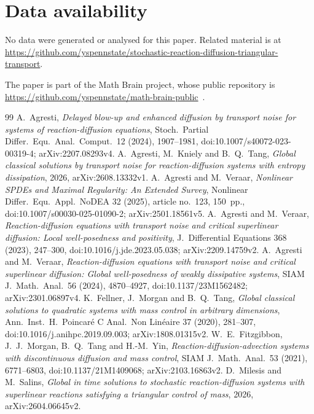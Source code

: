 \documentclass[11pt]{amsart}
\theoremstyle{definition}
\numberwithin{equation}{section}
\begin{document}
\section*{Data availability}
No data were generated or analysed for this paper. Related material is at
\url{https://github.com/yspennstate/stochastic-reaction-diffusion-triangular-transport}.

The paper is part of the Math Brain project, whose public repository is \url{https://github.com/yspennstate/math-brain-public}~\cite{MathBrainRepo}.

\begin{thebibliography}{99}
 A.~Agresti, \emph{Delayed blow-up and enhanced diffusion by transport noise for systems of reaction-diffusion equations}, Stoch.\ Partial Differ.\ Equ.\ Anal.\ Comput.\ 12 (2024), 1907--1981, doi:10.1007/s40072-023-00319-4; arXiv:2207.08293v4.
 A.~Agresti, M.~Kniely and B.~Q.~Tang, \emph{Global classical solutions by transport noise for reaction-diffusion systems with entropy dissipation}, 2026, arXiv:2608.13332v1.
 A.~Agresti and M.~Veraar, \emph{Nonlinear SPDEs and Maximal Regularity: An Extended Survey}, Nonlinear Differ.\ Equ.\ Appl.\ NoDEA 32 (2025), article no.~123, 150~pp., doi:10.1007/s00030-025-01090-2; arXiv:2501.18561v5.
 A.~Agresti and M.~Veraar, \emph{Reaction-diffusion equations with transport noise and critical superlinear diffusion: Local well-posedness and positivity}, J.\ Differential Equations 368 (2023), 247--300, doi:10.1016/j.jde.2023.05.038; arXiv:2209.14759v2.
 A.~Agresti and M.~Veraar, \emph{Reaction-diffusion equations with transport noise and critical superlinear diffusion: Global well-posedness of weakly dissipative systems}, SIAM J.\ Math.\ Anal.\ 56 (2024), 4870--4927, doi:10.1137/23M1562482; arXiv:2301.06897v4.
 K.~Fellner, J.~Morgan and B.~Q.~Tang, \emph{Global classical solutions to quadratic systems with mass control in arbitrary dimensions}, Ann.\ Inst.\ H.\ Poincar\'e C Anal.\ Non Lin\'eaire 37 (2020), 281--307, doi:10.1016/j.anihpc.2019.09.003; arXiv:1808.01315v2.
 W.~E.~Fitzgibbon, J.~J.~Morgan, B.~Q.~Tang and H.-M.~Yin, \emph{Reaction-diffusion-advection systems with discontinuous diffusion and mass control}, SIAM J.\ Math.\ Anal.\ 53 (2021), 6771--6803, doi:10.1137/21M1409068; arXiv:2103.16863v2.
 D.~Milesis and M.~Salins, \emph{Global in time solutions to stochastic reaction-diffusion systems with superlinear reactions satisfying a triangular control of mass}, 2026, arXiv:2604.06645v2.

\end{thebibliography}
\end{document}
